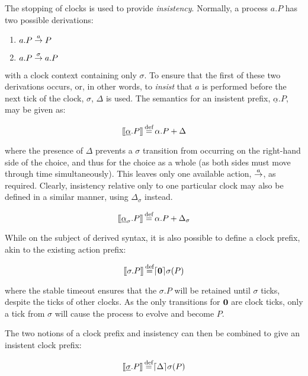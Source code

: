 The stopping of clocks is used to provide \emph{insistency}.  Normally,
a process $a.P$ has two possible derivations:

\begin{enumerate}
  \item $a.P \stackrel{a}{\rightarrow} P$
  \item $a.P \stackrel{\sigma}{\rightarrow} a.P$
\end{enumerate}

\noindent with a clock context containing only $\sigma$.  To ensure
that the first of these two derivations occurs, or, in other words, to
\emph{insist} that $a$ is performed before the next tick of the clock,
$\sigma$, $\Delta$ is used.  The semantics for an insistent prefix,
$\underline{\alpha}.P$, may be given as:

\begin{equation}
[\hspace{-0.3ex}[ \underline{\alpha}.P ]\hspace{-0.3ex}] \operatorname{\stackrel{\textrm{def}}{=}} \alpha.P + \Delta 
\end{equation}

\noindent where the presence of $\Delta$ prevents a $\sigma$
transition from occurring on the right-hand side of the choice, and
thus for the choice as a whole (as both sides must move through time
simultaneously).  This leaves only one available action,
$\stackrel{a}{\rightarrow}$, as required.  Clearly, insistency relative only to one
particular clock may also be defined in a similar manner, using
$\Delta_{\sigma}$ instead.

\begin{equation}
[\hspace{-0.3ex}[ \underline{\alpha}_{\sigma}.P ]\hspace{-0.3ex}] \operatorname{\stackrel{\textrm{def}}{=}} \alpha.P + \Delta_{\sigma} 
\end{equation}

While on the subject of derived syntax, it is also possible to define
a clock prefix, akin to the existing action prefix:

\begin{equation}
[\hspace{-0.3ex}[ \sigma.P ]\hspace{-0.3ex}] \operatorname{\stackrel{\textrm{def}}{=}} \lceil{\textbf{0}}\rceil {\sigma} ({P})
\end{equation}

\noindent where the stable timeout ensures that the $\sigma.P$ will be
retained until $\sigma$ ticks, despite the ticks of other clocks.  As
the only transitions for $\textbf{0}$ are clock ticks, only a tick from
$\sigma$ will cause the process to evolve and become $P$.

The two notions of a clock prefix and insistency can then be combined
to give an insistent clock prefix:

\begin{equation}
[\hspace{-0.3ex}[ \underline{\sigma}.P ]\hspace{-0.3ex}] \operatorname{\stackrel{\textrm{def}}{=}} \lceil{\Delta}\rceil {\sigma} ({P})
\end{equation}

